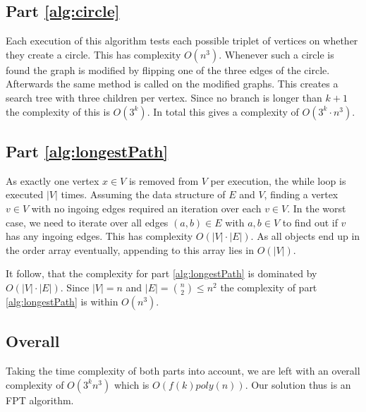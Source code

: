 \documentclass{article}
\begin{document}
\subsection{Part \ref{alg:circle}}
Each execution of this algorithm tests each possible triplet of vertices on whether they create a circle. This has complexity $O(n^3)$. Whenever such a circle is found the graph is modified by flipping one of the three edges of the circle. Afterwards the same method is called on the modified graphs. This creates a search tree with three children per vertex. Since no branch is longer than $k+1$ the complexity of this is $O(3^k)$. In total this gives a complexity of $O(3^k \cdot n^3)$.
\subsection{Part \ref{alg:longestPath}}
As exactly one vertex $x\in V$ is removed from $V$ per execution, the while loop is executed $|V|$ times. Assuming the data structure of $E$ and $V$, finding a vertex $v\in V$ with no ingoing edges required an iteration over each $v\in V$. In the worst case, we need to iterate over all edges $(a,b)\in E$ with $a,b\in V$ to find out if $v$ has any ingoing edges. This has complexity $O(|V| \cdot |E|)$. As all objects end up in the order array eventually, appending to this array lies in $O(|V|)$.

It follow, that the complexity for part \ref{alg:longestPath} is dominated by $O(|V| \cdot |E|)$. Since $|V| = n$ and $|E|=\binom{n}{2} \leq n^2$ the complexity of part \ref{alg:longestPath} is within $O(n^3)$.
\subsection{Overall}
Taking the time complexity of both parts into account, we are left with an overall complexity of $O(3^k n^3)$ which is $O(f(k)poly(n))$. Our solution thus is an FPT algorithm.
% 
% 
\end{document}
